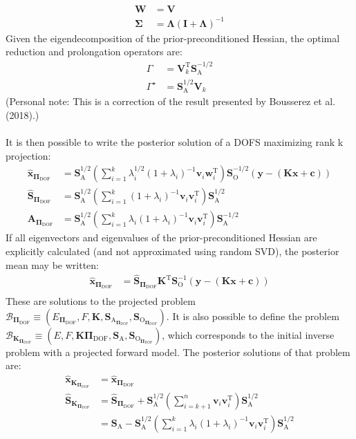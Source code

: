 \documentclass{article}
\newcommand{\g}{\Gamma}
\newcommand{\gstar}{\Gamma^{\star}}
\newcommand{\const}{\mathbf{c}}
\newcommand{\x}{\mathbf{x}}
\newcommand{\y}{\mathbf{y}}
\newcommand{\K}{\mathbf{K}}
\newcommand{\so}{\mathbf{S}_{\mathrm{O}}}
\newcommand{\sa}{\mathbf{S}_{\mathrm{A}}}
\newcommand{\xpost}{\mathbf{\hat{x}}}
\newcommand{\spost}{\mathbf{\hat{S}}}
\newcommand{\dof}[1]{#1_\mathrm{DOF}}
\newcommand{\pidof}{\dof{\mathbf{\Pi}}}
\newcommand{\xpostdof}{\mathbf{\hat{x}}_{\pidof}}
\newcommand{\spostdof}{\mathbf{\hat{S}}_{\pidof}}
\newcommand{\Adof}{\mathbf{A}_{\pidof}}
\begin{document}
{\begin{align}
\mathbf{W} &= \mathbf{V}\\
\mathbf{\Sigma} &= \mathbf{\Lambda}(\mathbf{I} + \mathbf{\Lambda})^{-1}
\end{align}
Given the eigendecomposition of the prior-preconditioned Hessian, the optimal reduction and prolongation operators are:
\begin{align}
	\label{reduction_op}\g &= \mathbf{V}_k^{\mathrm{T}}\sa^{-1/2}\\
	\label{prolongation_op}\gstar &= \sa^{1/2}\mathbf{V}_k
\end{align}
(Personal note: This is a correction of the result presented by Bousserez et al. (2018).)\\
\\
It is then possible to write the posterior solution of a DOFS maximizing rank k projection:
\begin{align}
	\xpostdof &= \sa^{1/2}\left( \sum_{i = 1}^{k} \lambda_i^{1/2}(1+\lambda_i)^{-1}\mathbf{v}_i\mathbf{w}_i^{\mathrm{T}}  \right)\so^{-1/2}(\y - (\K\x + \const))\\
	\spostdof &= \sa^{1/2}\left( \sum_{i=1}^{k} (1+\lambda_i)^{-1}\mathbf{v}_i\mathbf{v}_i^\mathrm{T} \right)\sa^{1/2}\\
	\Adof &= \sa^{1/2} \left( \sum_{i=1}^{k} \lambda_i(1+\lambda_i)^{-1}\mathbf{v}_i\mathbf{v}_i^\mathrm{T} \right)\sa^{-1/2}
\end{align}
If all eigenvectors and eigenvalues of the prior-preconditioned Hessian are explicitly calculated (and not approximated using random SVD), the posterior mean may be written:
\begin{align}
	\xpostdof &= \spostdof \K^{\mathrm{T}} \so^{-1}(\y - (\K\x + \const))\\
\end{align}
These are solutions to the projected problem $\mathcal{B}_{\pidof} \equiv (E_{\pidof},F,\K,\mathbf{S}_{\mathrm{A}_{\pidof}}, \mathbf{S}_{\mathrm{O}_{\pidof}})$. It is also possible to define the problem $\mathcal{B}_{\K_{\pidof}} \equiv (E,F,\K\pidof,\sa, \mathbf{S}_{\mathrm{O}_{\pidof}})$, which corresponds to the initial inverse problem with a projected forward model. The posterior solutions of that problem are:
\begin{align}
	\xpost_{\K_{\pidof}} &= \xpostdof\\
	\spost_{\K_{\pidof}} &= \spostdof + \sa^{1/2} \left( \sum_{i = k+1}^{n} \mathbf{v}_i \mathbf{v}_i^\mathrm{T} \right) \sa^{1/2}\\
	&= \sa -  \sa^{1/2}\left( \sum_{i=1}^{k} \lambda_i(1+\lambda_i)^{-1}\mathbf{v}_i\mathbf{v}_i^\mathrm{T} \right)\sa^{1/2}\\

\end{align}}
\end{document}
